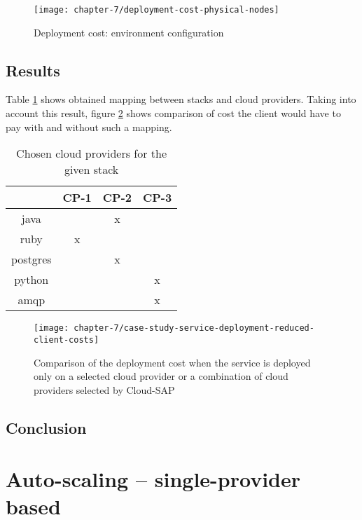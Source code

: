 \begin{figure}[!ht]
  \begin{center}
    \texttt{[image: chapter-7/deployment-cost-physical-nodes]}
  \end{center}
  \caption{Deployment cost: environment configuration}
  \label{eval:deployment-cost-physical-nodes}
\end{figure}


\subsection*{Results}
Table \ref{tbl:test-service-deployment-cost-mapping} shows obtained mapping between stacks and cloud providers. Taking into account this result, figure \ref{ch7:service-deployment-cost} shows comparison of cost the client would have to pay with and without such a mapping.

\begin{table}
  \centering
  \begin{tabular}{ | c | c | c | c | }
    \hline                        
    & CP-1 & CP-2 & CP-3 \\
    \hline
    java      & & x & \\
    ruby      & x & & \\
    postgres  & & x & \\
    python    & & & x \\
    amqp      & & & x \\
    \hline  
  \end{tabular}
  \caption{Chosen cloud providers for the given stack}
  \label{tbl:test-service-deployment-cost-mapping}
\end{table}

\begin{figure}[!ht]
  \begin{center}
    \texttt{[image: chapter-7/case-study-service-deployment-reduced-client-costs]}
  \end{center}
  \caption{Comparison of the deployment cost when the service is deployed only on a selected cloud provider or a combination of cloud providers selected by Cloud-SAP}
  \label{ch7:service-deployment-cost}
\end{figure}

\subsection*{Conclusion}

\section{Auto-scaling -- single-provider based}
